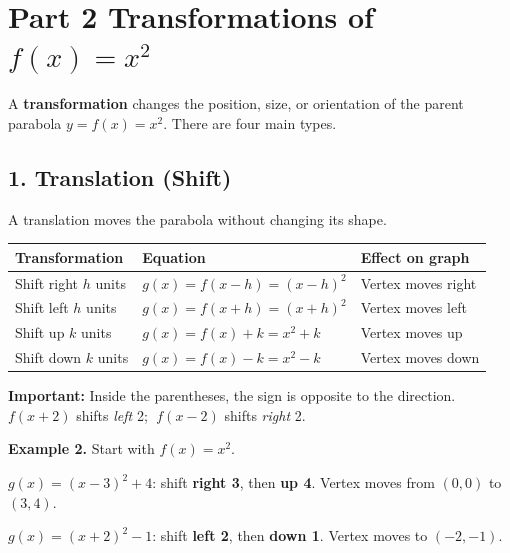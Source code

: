 \documentclass[11pt]{article}
\begin{document}
\section*{Part 2 \quad Transformations of $f(x) = x^2$}

A \textbf{transformation} changes the position, size, or orientation of the parent
parabola $y = f(x) = x^2$. There are four main types.

\subsection*{1. \; Translation (Shift)}

A translation moves the parabola without changing its shape.

\begin{center}
\renewcommand{\arraystretch}{1.6}
\begin{tabular}{|l|l|l|}
\hline
\textbf{Transformation} & \textbf{Equation} & \textbf{Effect on graph} \\
\hline
Shift right $h$ units  & $g(x) = f(x - h) = (x-h)^2$  & Vertex moves right \\
Shift left  $h$ units  & $g(x) = f(x + h) = (x+h)^2$  & Vertex moves left \\
Shift up    $k$ units  & $g(x) = f(x) + k = x^2 + k$  & Vertex moves up \\
Shift down  $k$ units  & $g(x) = f(x) - k = x^2 - k$  & Vertex moves down \\
\hline
\end{tabular}
\end{center}

\medskip
\textbf{Important:} Inside the parentheses, the sign is opposite to the direction.
$f(x+2)$ shifts \textit{left} 2; $\; f(x-2)$ shifts \textit{right} 2.

\begin{exbox}
\textbf{Example 2.} Start with $f(x)=x^2$.

$g(x) = (x - 3)^2 + 4$: shift \textbf{right 3}, then \textbf{up 4}.
Vertex moves from $(0,0)$ to $(3,4)$.

$g(x) = (x + 2)^2 - 1$: shift \textbf{left 2}, then \textbf{down 1}.
Vertex moves to $(-2,-1)$.
\end{exbox}
\end{document}
